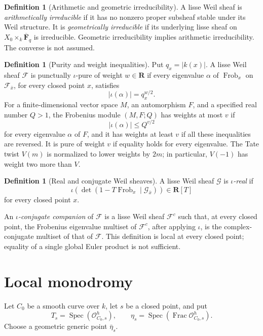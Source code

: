 \documentclass[10pt]{article}
\theoremstyle{definition}
\newtheorem{definition}[theorem]{Definition}
\newcommand{\Fbar}{\overline{\mathbf F}_q}
\newcommand{\Frob}{\operatorname{Frob}}
\begin{document}
\begin{definition}[Arithmetic and geometric irreducibility]
A lisse Weil sheaf is \emph{arithmetically irreducible} if it has no nonzero
proper subsheaf stable under its Weil structure.  It is
\emph{geometrically irreducible} if its underlying lisse sheaf on
\(X_0\times_k\Fbar\) is irreducible.  Geometric irreducibility implies
arithmetic irreducibility.  The converse is not assumed.
\end{definition}

\begin{definition}[Purity and weight inequalities]
Put \(q_x=|k(x)|\).  A lisse Weil sheaf \(\mathcal F\) is punctually
\(\iota\)-pure of weight \(w\in\mathbf R\) if every eigenvalue \(\alpha\)
of \(\Frob_x\) on \(\mathcal F_{\bar x}\), for every closed point \(x\),
satisfies
\[
                         |\iota(\alpha)|=q_x^{w/2}.
\]
For a finite-dimensional vector space \(M\), an automorphism \(F\), and a
specified real number \(Q>1\), the Frobenius module \((M,F;Q)\) has weights
at most \(v\) if
\[
 |\iota(\alpha)|\le Q^{v/2}
\]
for every eigenvalue \(\alpha\) of \(F\), and it has weights at least \(v\)
if all these inequalities are reversed.  It is pure of weight \(v\) if
equality holds for every eigenvalue.
The Tate twist \(V(m)\) is normalized to lower weights by \(2m\); in
particular, \(V(-1)\) has weight two more than \(V\).
\end{definition}

\begin{definition}[Real and conjugate Weil sheaves]
A lisse Weil sheaf \(\mathcal G\) is \emph{\(\iota\)-real} if
\[
 \iota\!\left(\det(1-T\Frob_x\mid\mathcal G_{\bar x})\right)
                         \in\mathbf R[T]
\]
for every closed point \(x\).

An \emph{\(\iota\)-conjugate companion} of \(\mathcal F\) is a lisse Weil
sheaf \(\mathcal F^c\) such that, at every closed point, the Frobenius
eigenvalue multiset of \(\mathcal F^c\), after applying \(\iota\), is the
complex-conjugate multiset of that of \(\mathcal F\).  This definition is
local at every closed point; equality of a single global Euler product is
not sufficient.
\end{definition}

\section{Local monodromy}

Let \(C_0\) be a smooth curve over \(k\), let \(s\) be a closed point, and
put
\[
 T_s=\operatorname{Spec}(\mathcal O^h_{C_0,s}),\qquad
 \eta_s=\operatorname{Spec}(\operatorname{Frac}\mathcal O^h_{C_0,s}).
\]
Choose a geometric generic point \(\bar\eta_s\).
\end{document}
